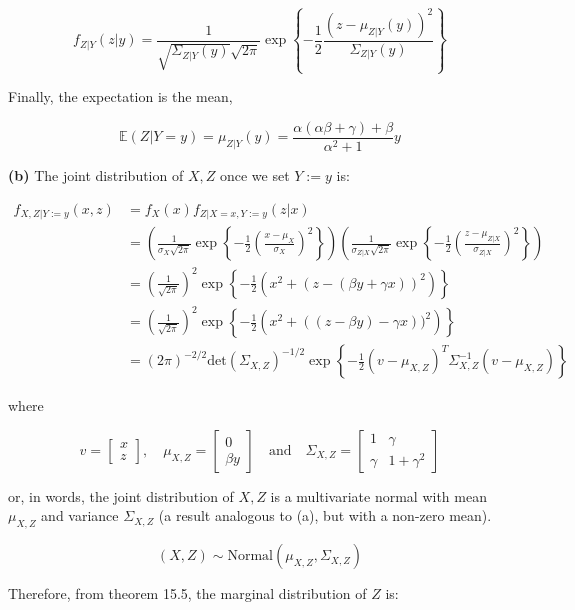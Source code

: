 \[ f_{Z | Y}(z | y) = \frac{1}{\sqrt{\Sigma_{Z | Y}(y)} \sqrt{2 \pi}} \exp \left\{ -\frac{1}{2} \frac{\left( z - \mu_{Z | Y}(y) \right)^2}{\Sigma_{Z | Y}(y)} \right\} \]

Finally, the expectation is the mean,

\[\mathbb{E}(Z | Y = y) = \mu_{Z | Y} (y) = \frac{\alpha(\alpha \beta + \gamma) + \beta}{\alpha^2 + 1} y\]

\textbf{(b)} The joint distribution of \(X, Z\) once we set \(Y := y\)
is:

\[ 
\begin{align}
f_{X, Z | Y := y}(x, z) &= f_X(x) f_{Z | X = x, Y := y}(z | x) \\
&= \left(\frac{1}{\sigma_X \sqrt{2\pi}} \exp \left\{-\frac{1}{2} \left(\frac{x - \mu_X}{\sigma_X}\right)^2 \right\} \right)
\left(\frac{1}{\sigma_{Z | X} \sqrt{2\pi}} \exp \left\{-\frac{1}{2} \left(\frac{z - \mu_{Z | X}}{\sigma_{Z | X}}\right)^2 \right\}\right) \\
&= \left( \frac{1}{\sqrt{2 \pi}} \right)^2 \exp \left\{ -\frac{1}{2} \left( x^2 + (z - (\beta y + \gamma x))^2\right) \right\} \\
&= \left( \frac{1}{\sqrt{2 \pi}} \right)^2 \exp \left\{ -\frac{1}{2} \left( x^2 + ((z - \beta y) - \gamma x))^2\right) \right\} \\
&= (2 \pi)^{-2 / 2} \text{det} (\Sigma_{X, Z})^{-1/2} \exp \left\{ -\frac{1}{2} (v - \mu_{X, Z})^T \Sigma_{X, Z}^{-1} (v - \mu_{X, Z})\right\}
\end{align}
\]

where

\[
v = \begin{bmatrix}x \\ z\end{bmatrix},
\quad \mu_{X, Z} = \begin{bmatrix}0 \\ \beta y\end{bmatrix}
\quad \text{and} \quad
\Sigma_{X, Z} = \begin{bmatrix}
1  & \gamma \\
\gamma & 1 + \gamma^2
\end{bmatrix}
\]

or, in words, the joint distribution of \(X, Z\) is a multivariate
normal with mean \(\mu_{X, Z}\) and variance \(\Sigma_{X, Z}\) (a result
analogous to (a), but with a non-zero mean).

\[ (X, Z) \sim \text{Normal}(\mu_{X, Z}, \Sigma_{X, Z})\]

Therefore, from theorem 15.5, the marginal distribution of \(Z\) is:

